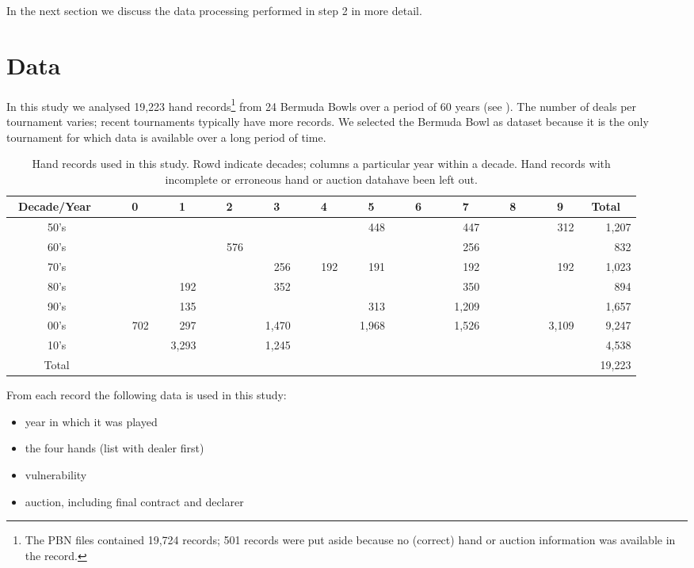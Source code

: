 \documentclass{llncs}
\begin{document}
In the next section we discuss the data processing performed in step 2
in more detail.

\section{Data}
\label{sec:data}

In this study we analysed 19,223 hand records\footnote{%
  The PBN files contained 19,724 records; 501 records were put aside
  because no (correct) hand or auction information was available in
  the record.}  from 24 Bermuda Bowls over a period of 60 years (see
).  The number of deals per tournament varies; recent
tournaments typically have more records.  We selected the Bermuda Bowl
as dataset because it is the only tournament for which data is
available over a long period of time.

\begin{table}
\centering\footnotesize
\caption{Hand records used in this study. Rowd indicate decades;
  columns a particular year within  a decade. Hand records with
  incomplete or erroneous hand or auction datahave been left out.}
\label{tbl:data}
\begin{tabular}{|c|r|r|r|r|r|r|r|r|r|r|r|}
\hline
\bf\ Decade/Year \ &
\bf \ \ \ 0 \ &\bf \ \ \ 1 \ &\bf \ \ \ 2 \ &\bf \ \ \ 3 \ &\bf \ \ \ 4 \ &
\bf \ \ \ 5 \ &\bf \ \ \ 6 \ &\bf \ \ \ 7 \ &\bf \ \ \ 8 \ &\bf \ \ \ 9 \ &
\bf \ Total \ \\ \hline\hline
50's &  &  &  &  &  & 448 &  & 447 &  & 312 & 1,207 \\ \hline
60's &  &  & 576 &  &  &  &  & 256 &  &  & 832 \\ \hline
70's &  &  &  & 256 & 192 & 191 &  & 192 &  & 192 & 1,023 \\ \hline
80's &  & 192 &  & 352 &  &  &  & 350 &  &  & 894 \\ \hline
90's &  & 135 &  &  &  & 313 &  & 1,209 &  &  & 1,657 \\ \hline
00's & 702 & 297 &  & 1,470 &  & 1,968 &  & 1,526 &  & 3,109 & 9,247 \\ \hline
10's &  & 3,293 &  & 1,245 &  &  &  &  &  &  & 4,538 \\ \hline\hline
Total &  &  &  &  &  &  &  &  &  &  & 19,223 \\ \hline
\hline
\end{tabular}
\end{table}

From each record the following data is used in this study: 
\begin{itemize}
\item year in which it was played
\item the four hands (list with dealer first)
\item vulnerability
\item auction, including final contract and declarer
\end{itemize}
\end{document}
